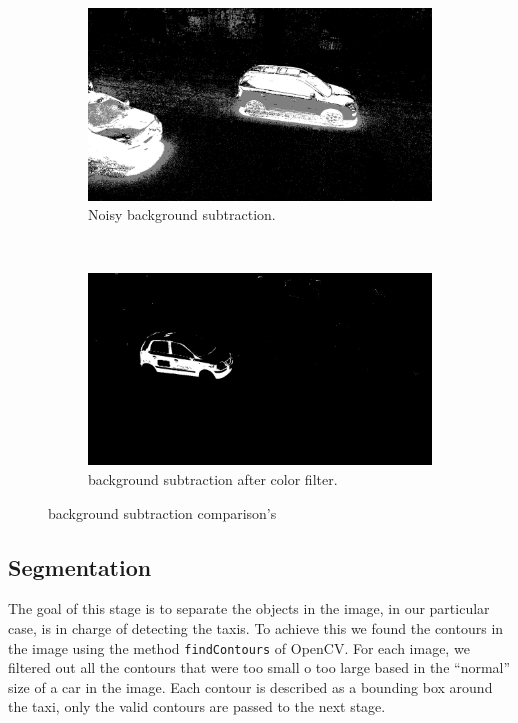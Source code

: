 \documentclass[journal]{IEEEtran}
\begin{document}
\begin{figure}
  \centering
  \begin{subfigure}[b]{0.2\textwidth}
  \includegraphics[scale=0.09]{../img/noisy}
  \caption{Noisy background subtraction.}
  \end{subfigure}
  ~ %
  \begin{subfigure}[b]{0.2\textwidth}
  \includegraphics[scale=0.09]{../img/background}
  \caption{background subtraction after color filter.}
  \end{subfigure}
  \caption{background subtraction comparison's}
  \label{background-comp}
\end{figure}



\subsection{Segmentation}

The goal of this stage is to separate the objects in the image, in our particular
case, is in charge of detecting the taxis. To achieve this we found the contours
in the image using the method \texttt{findContours} of OpenCV. For each image,
we filtered out all the contours that were too small o too large based in the
``normal'' size of a car in the image. Each contour is described as a bounding
box around the taxi, only the valid contours are passed to the next stage.
\end{document}
